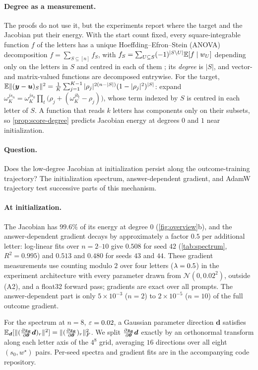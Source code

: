 \paragraph{Degree as a measurement.} The proofs do not use it, but the experiments report where the target and the Jacobian put their
energy. With the start count fixed, every square-integrable function $f$ of the letters has a unique Hoeffding--Efron--Stein (ANOVA)
decomposition $f=\sum_{S\subseteq[n]}f_S$, with $f_S=\sum_{U\subseteq S}(-1)^{|S\setminus U|}\mathbb E[f\mid w_U]$ depending only on the letters in $S$ and centred in each
of them \citep{hoeffding1948class,efron1981jackknife,odonnell2014analysis}; its \emph{degree} is $|S|$, and vector- and matrix-valued functions are
decomposed entrywise. For the target, $\mathbb E\|(\bm y-\bm u)_S\|^2=\frac{1}{K}\sum_{j=1}^{K-1}|\rho_j|^{2(n-|S|)}(1-|\rho_j|^2)^{|S|}$: expand
$\omega_K^{js_n}=\omega_K^{js_0}\prod_t\bigl(\rho_j+(\omega_K^{jb_t}-\rho_j)\bigr)$, whose term indexed by $S$ is centred in each letter of $S$. A function that reads $k$ letters
has components only on their subsets, so \cref{prop:score-degree} predicts Jacobian energy at degrees $0$ and $1$ near initialization.

\paragraph{Question.} Does the low-degree Jacobian at initialization persist along the outcome-training trajectory?
The initialization spectrum, answer-dependent gradient, and AdamW trajectory test successive parts of this mechanism.

\paragraph{At initialization.} The Jacobian has $99.6\%$ of its energy at degree $0$ (\cref{fig:overview}b), and the answer-dependent
gradient decays by approximately a factor $0.5$ per additional letter: log-linear fits over $n=2$--$10$ give $0.508$ for seed $42$
(\cref{tab:spectrum}, $R^2=0.995$) and $0.513$ and $0.480$ for seeds $43$ and $44$. These gradient measurements use
counting modulo $2$ over four letters ($\lambda=0.5$) in the experiment architecture with every parameter drawn from
$\mathcal N(0,0.02^2)$, outside (A2), and a float32 forward pass; gradients are exact over all prompts. The answer-dependent part is only
$5\times10^{-3}$ ($n=2$) to $2\times10^{-5}$ ($n=10$) of the full outcome gradient.

For the spectrum at $n=8$, $\varepsilon=0.02$, a Gaussian parameter direction $\bm d$ satisfies
$\E_{\bm d}[\|(\Jz\bm d)_r\|^2]=\|(\Jz)_r\|_F^2$.
We split $\Jz\bm d$ exactly by an orthonormal transform along each letter axis of the $4^8$ grid,
averaging $16$ directions over all eight $(s_0,w^\star)$ pairs. Per-seed spectra and gradient fits are in the accompanying code repository.


